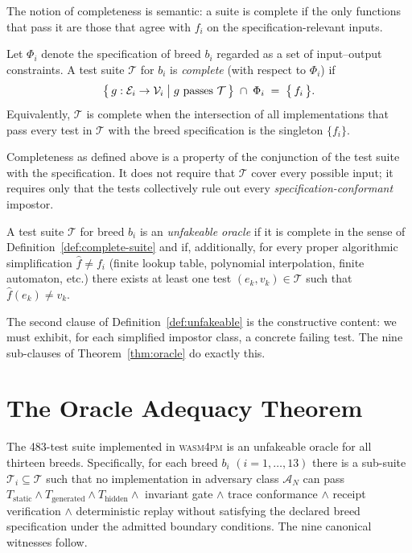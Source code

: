 The notion of completeness is semantic: a suite is complete if the only
functions that pass it are those that agree with $f_i$ on the
specification-relevant inputs.

\begin{definition}
\label{def:complete-suite}
Let $\Phi_i$ denote the specification of breed $b_i$ regarded as a set of
input--output constraints.  A test suite $\mathcal{T}$ for $b_i$ is
\emph{complete} (with respect to $\Phi_i$) if
\[
  \bigl\{\, g : \mathcal{E}_i \to \mathcal{V}_i \;\big|\; g \text{ passes } \mathcal{T} \,\bigr\}
  \;\cap\;
  \Phi_i
  \;=\;
  \bigl\{\, f_i \,\bigr\}.
\]
Equivalently, $\mathcal{T}$ is complete when the intersection of all
implementations that pass every test in $\mathcal{T}$ with the breed
specification is the singleton $\{f_i\}$.
\end{definition}

Completeness as defined above is a property of the conjunction of the test
suite with the specification.  It does not require that $\mathcal{T}$ cover
every possible input; it requires only that the tests collectively rule out
every \emph{specification-conformant} impostor.

\begin{definition}
\label{def:unfakeable}
A test suite $\mathcal{T}$ for breed $b_i$ is an \emph{unfakeable oracle}
if it is complete in the sense of Definition~\ref{def:complete-suite} and
if, additionally, for every proper algorithmic simplification
$\hat{f} \neq f_i$ (finite lookup table, polynomial interpolation, finite
automaton, etc.) there exists at least one test $(e_k, v_k) \in \mathcal{T}$
such that $\hat{f}(e_k) \neq v_k$.
\end{definition}

The second clause of Definition~\ref{def:unfakeable} is the constructive
content: we must exhibit, for each simplified impostor class, a concrete
failing test.  The nine sub-clauses of Theorem~\ref{thm:oracle} do exactly
this.

\section{The Oracle Adequacy Theorem}
\label{sec:oracle-theorem}

\begin{theorem}
\label{thm:oracle}
\label{thm:oracle-hierarchy}
The 483-test suite implemented in \textsc{wasm4pm} is an unfakeable oracle
for all thirteen breeds.  Specifically, for each breed $b_i$
$(i = 1, \ldots, 13)$ there is a sub-suite $\mathcal{T}_i \subseteq
\mathcal{T}$ such that no implementation in adversary class $\mathcal{A}_N$
can pass $T_{\text{static}} \wedge T_{\text{generated}} \wedge T_{\text{hidden}}
\wedge$ invariant gate $\wedge$ trace conformance $\wedge$ receipt verification
$\wedge$ deterministic replay without satisfying the declared breed specification
under the admitted boundary conditions.  The nine canonical witnesses follow.
\end{theorem}

